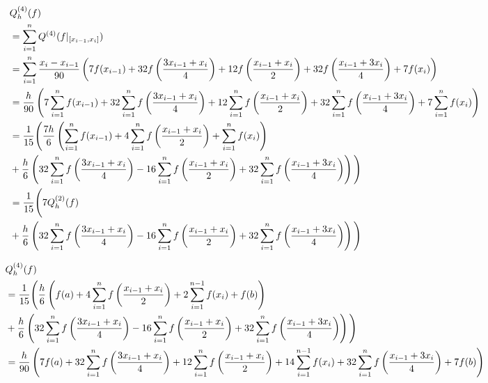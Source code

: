 \begin{align*}
    & Q_h^{(4)}(f) \\
    & = \sum_{i=1}^n Q^{(4)}(f|_{[x_{i-1}, x_i]}) \\
    & = \sum_{i=1}^n
        \frac{x_i - x_{i-1}}{90}
        \left ( 
            7  f(x_{i-1}) + 
            32 f \left ( \frac{3 x_{i-1} + x_i}{4} \right ) +
            12 f \left ( \frac{x_{i-1} + x_i}{2} \right ) +
            32 f \left ( \frac{x_{i-1} + 3 x_i}{4} \right ) +
            7  f(x_i)
         \right ) \\
    & = \frac{h}{90}
        \left ( 
            7  \sum_{i=1}^n f(x_{i-1}) + 
            32 \sum_{i=1}^n f \left ( \frac{3 x_{i-1} + x_i}{4} \right ) +
            12 \sum_{i=1}^n f \left ( \frac{x_{i-1} + x_i}{2} \right ) +
            32 \sum_{i=1}^n f \left ( \frac{x_{i-1} + 3 x_i}{4} \right ) +
            7  \sum_{i=1}^n f(x_i)
         \right ) \\
    & = \frac{1}{15}
        \Bigg (
            \frac{7h}{6}
            \left ( 
                  \sum_{i=1}^n f(x_{i-1}) +
                4 \sum_{i=1}^n f \left ( \frac{x_{i-1} + x_i}{2} \right ) +
                  \sum_{i=1}^n f(x_i)
             \right ) \\
    & +
            \frac{h}{6}
            \left ( 
                32 \sum_{i=1}^n f \left ( \frac{3 x_{i-1} + x_i}{4} \right ) -
                16 \sum_{i=1}^n f \left ( \frac{x_{i-1} + x_i}{2} \right ) +
                32 \sum_{i=1}^n f \left ( \frac{x_{i-1} + 3 x_i}{4} \right )
             \right )
        \Bigg ) \\
    & = \frac{1}{15}
        \Bigg (
            7 Q_h^{(2)}(f) \\
    & +
            \frac{h}{6}
            \left ( 
                32 \sum_{i=1}^n f \left ( \frac{3 x_{i-1} + x_i}{4} \right ) -
                16 \sum_{i=1}^n f \left ( \frac{x_{i-1} + x_i}{2} \right ) +
                32 \sum_{i=1}^n f \left ( \frac{x_{i-1} + 3 x_i}{4} \right )
             \right )
        \Bigg )
\end{align*}

\begin{align*}
    & Q_h^{(4)}(f) \\
    & = \frac{1}{15}
        \Bigg (
            \frac{h}{6}
            \left ( 
                f(a) +
                4 \sum_{i=1}^n f \left ( \frac{x_{i-1} + x_i}{2} \right ) +
                2 \sum_{i=1}^{n-1} f(x_i) +
                f(b)
             \right ) \\
    & +
            \frac{h}{6}
            \left ( 
                32 \sum_{i=1}^n f \left ( \frac{3 x_{i-1} + x_i}{4} \right ) -
                16 \sum_{i=1}^n f \left ( \frac{x_{i-1} + x_i}{2} \right ) +
                32 \sum_{i=1}^n f \left ( \frac{x_{i-1} + 3 x_i}{4} \right )
             \right )
        \Bigg ) \\
    & = \frac{h}{90}
        \left ( 
            7 f(a) +
            32 \sum_{i=1}^n f \left ( \frac{3 x_{i-1} + x_i}{4} \right ) +
            12 \sum_{i=1}^n f \left ( \frac{x_{i-1} + x_i}{2} \right ) +
            14 \sum_{i=1}^{n-1} f(x_i) +
            32 \sum_{i=1}^n f \left ( \frac{x_{i-1} + 3 x_i}{4} \right ) +
            7 f(b)
         \right )
\end{align*}